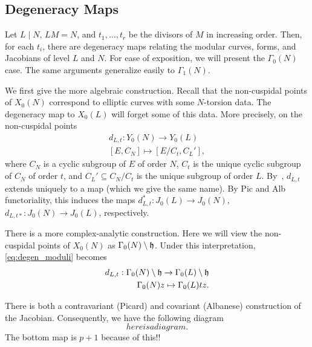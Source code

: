 \documentclass[11pt, proquest]{uwthesis}
\begin{document}
\subsection{Degeneracy Maps}%
\label{sub:degeneracy_maps}

Let $L\mid N$, $LM=N$, and $t_1,\ldots,t_r$ be the divisors of $M$ in
increasing order. Then, for each $t_i$, there are degeneracy maps relating the
modular curves, forms, and Jacobians of level $L$ and $N$. For ease of
exposition, we will present the $\Gamma_0(N)$ case. The same arguments
generalize easily to $\Gamma_1(N)$.

We first give the more algebraic construction. Recall that the non-cuspidal
points of $X_0(N)$ correspond to elliptic curves with some $N$-torsion data.
The degeneracy map to $X_0(L)$ will forget some of this data. More precisely,
on the non-cuspidal points
\begin{equation}
    \label{eq:degen_moduli}
    \begin{split}
        d_{L,t}: Y_0(N)  \to Y_0(L) \\
        [ E, C_N ]       \mapsto [ E/C_t, C_L ' ],
    \end{split}
\end{equation}
where $C_N$ is a cyclic subgroup of $E$ of order $N$, $C_t$ is the unique
cyclic subgroup of $C_N$ of order $t$, and $C_L '\subseteq C_N/C_t$ is the
unique subgroup of order $L$. By~\cite[Chap. 1, Prop. 6.8]{hartshorne},
$d_{L,t}$ extends uniquely to a map (which we give the same name). By Pic and
Alb functoriality, this induces the maps $d_{L,t} ^*:J_0(L)\to J_0(N)$, $d_{L,
t*} :J_0(N)\to J_0(L)$, respectively.

There is a more complex-analytic construction. Here we will view the
non-cuspidal points of $X_0(N)$ as $\Gamma_0(N)\setminus \mathfrak{h}$. Under this
interpretation, \eqref{eq:degen_moduli} becomes
\begin{equation}
    \label{eq:degen_analytic}
    \begin{split}
        d_{L,t}: \Gamma_0(N)\setminus \mathfrak{h} \to \Gamma_0(L)\setminus \mathfrak{h} \\
        \Gamma_0(N)z\mapsto \Gamma_0(L) tz.
    \end{split}
\end{equation}

There is both a contravariant (Picard) and covariant (Albanese) construction of
the Jacobian. Consequently, we have the following diagram
\[
    here is a diagram.
\]
The bottom map is $p+1$ because of this!!
\end{document}
